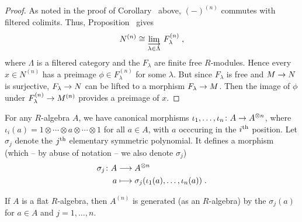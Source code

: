 \documentclass[a4paper,parskip=half,numbers=enddot, DIV=12]{scrreprt}
\begin{document}
\begin{proof}
	As noted in the proof of Corollary~ above, $(-)^{(n)}$ commutes with filtered colimits. Thus, Proposition~ gives 
	\begin{align*}
		N^{(n)}\cong \colimit[\lambda\in\Lambda] F_\lambda^{(n)}\;,
	\end{align*}
	where $\Lambda$ is a filtered category and the $F_\lambda$ are finite free $R$-modules. Hence every $x\in N^{(n)}$ has a preimage $\phi\in F_\lambda^{(n)}$ for some $\lambda$. But since $F_\lambda$ is free and $M\morphism N$ is surjective, $F_\lambda\morphism N$ can be lifted to a morphism $F_\lambda\morphism M$. Then the image of $\phi$ under $F_\lambda^{(n)}\morphism M^{(n)}$ provides a preimage of $x$.
\end{proof}
For any $R$-algebra $A$, we have canonical morphisms $\iota_1,\ldots,\iota_n\colon A\morphism A^{\otimes n}$, where $\iota_i(a)=1\otimes \cdots \otimes a\otimes \cdots \otimes 1$ for all $a\in A$, with $a$ occcuring in the $i^{\text{th}}$ position. Let $\sigma_j$ denote the $j^{\text{th}}$ elementary symmetric polynomial. It defines a morphism (which -- by abuse of notation -- we also denote $\sigma_j$)
\begin{align*}
\sigma_j\colon A&\morphism A^{\otimes n}\\
a&\longmapsto \sigma_j(\iota_1(a),\ldots,\iota_n(a))\;.
\end{align*}
\begin{cor}
	If $A$ is a flat $R$-algebra, then $A^{(n)}$ is generated (as an $R$-algebra) by the $\sigma_j(a)$ for $a\in A$ and $j=1,\ldots,n$.
\end{cor}
\end{document}
